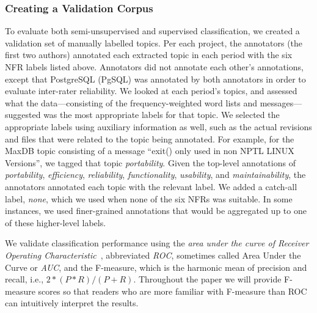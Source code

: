 \documentclass[smallextended]{svjour3}       %
\begin{document}

\subsubsection{Creating a Validation Corpus}
To evaluate both semi-unsupervised and supervised classification, we
created a validation set of manually labelled topics. Per each project,
 the annotators (the first two authors) annotated each extracted topic in each period with
the six NFR labels listed above.
Annotators did not annotate each other's annotations, except that
PostgreSQL (PgSQL) was annotated by both annotators in order
to evaluate inter-rater reliability.
We looked at each period's topics, and assessed what the data---consisting of the frequency-weighted word lists and messages---suggested was the most appropriate labels for that topic. 
We selected the appropriate labels using auxiliary information as well, such as the actual revisions and files that were related to the
topic being annotated.
For example, for the MaxDB topic consisting of a message ``exit() only
used in non NPTL LINUX Versions'', we tagged that topic
\emph{portability}. 
Given the top-level annotations of \emph{portability},
\emph{efficiency}, \emph{reliability}, \emph{functionality},
\emph{usability}, and \emph{maintainability}, the annotators annotated each topic
with the relevant label. We added a catch-all label, \emph{none}, which we used when none of the six NFRs was suitable. In some instances, we used finer-grained
annotations that would be aggregated up to one of these higher-level labels. 

We validate classification performance using the \emph{area under the curve
of Receiver Operating
Characteristic}~\cite{Fawcett2006861},
abbreviated \emph{ROC}, sometimes called Area Under the Curve or \emph{AUC}, and the
F-measure, which is the harmonic mean of precision and recall, i.e.,
$2 * (P * R) / (P + R)$. 
Throughout the paper we will provide F-measure scores so that readers
who are more familiar with F-measure than ROC can intuitively
interpret the results.
\end{document}
